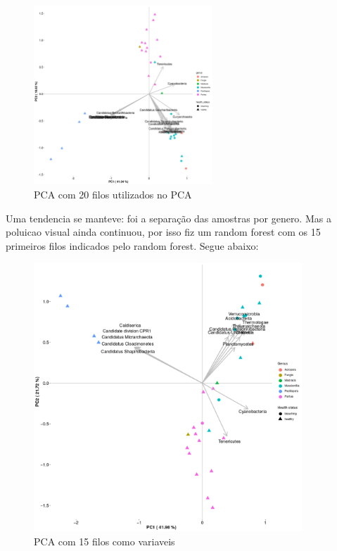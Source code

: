 \documentclass[12pt, a4paper]{report}
\begin{document}
\begin{figure}[!h]
  \centering 
  \includegraphics[width=0.6\textwidth]{figures/output_rf_20_PCA_corais_2018_10_01.jpg}
  \caption{PCA com 20 filos utilizados no PCA}
  \end{figure}
\newpage
Uma tendencia se manteve: foi a separação das amostras por genero.  Mas a poluicao visual ainda continuou, por isso fiz um random forest com os 15 primeiros filos indicados pelo random forest. Segue abaixo: 
\begin{figure}[!h]
  \centering 
  \includegraphics[width=0.9\textwidth]{figures/output_rf_15_PCA_corais_2018_10_01_edited_3.png}
  \caption{PCA com 15 filos como variaveis}
  \end{figure}
\end{document}

